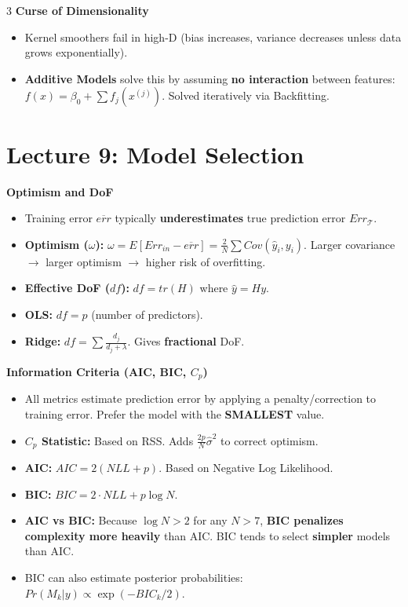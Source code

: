 \documentclass[10pt,landscape]{article}
\begin{document}
\begin{multicols*}{3}
\textbf{Curse of Dimensionality}
\begin{itemize}
    \item Kernel smoothers fail in high-D (bias increases, variance decreases unless data grows exponentially).
    \item \textbf{Additive Models} solve this by assuming \textbf{no interaction} between features: $f(x) = \beta_0 + \sum f_j(x^{(j)})$. Solved iteratively via Backfitting.
\end{itemize}

\section{Lecture 9: Model Selection}
\textbf{Optimism and DoF}
\begin{itemize}
    \item Training error $\overline{err}$ typically \textbf{underestimates} true prediction error $Err_{\mathcal{T}}$.
    \item \textbf{Optimism ($\omega$):} $\omega = E[Err_{in} - \overline{err}] = \frac{2}{N} \sum Cov(\hat{y}_i, y_i)$. Larger covariance $\to$ larger optimism $\to$ higher risk of overfitting.
    \item \textbf{Effective DoF ($df$):} $df = tr(H)$ where $\hat{y} = Hy$.
    \item \textbf{OLS:} $df = p$ (number of predictors).
    \item \textbf{Ridge:} $df = \sum \frac{d_j}{d_j + \lambda}$. Gives \textbf{fractional} DoF.
\end{itemize}

\textbf{Information Criteria (AIC, BIC, $C_p$)}
\begin{itemize}
    \item All metrics estimate prediction error by applying a penalty/correction to training error. Prefer the model with the \textbf{SMALLEST} value.
    \item \textbf{$C_p$ Statistic:} Based on RSS. Adds $\frac{2p}{N}\hat{\sigma}^2$ to correct optimism.
    \item \textbf{AIC:} $AIC = 2(NLL + p)$. Based on Negative Log Likelihood.
    \item \textbf{BIC:} $BIC = 2 \cdot NLL + p \log N$. 
    \item \textbf{AIC vs BIC:} Because $\log N > 2$ for any $N > 7$, \textbf{BIC penalizes complexity more heavily} than AIC. BIC tends to select \textbf{simpler} models than AIC.
    \item BIC can also estimate posterior probabilities: $Pr(M_k|y) \propto \exp(-BIC_k/2)$.
\end{itemize}

\end{multicols*}
\end{document}
